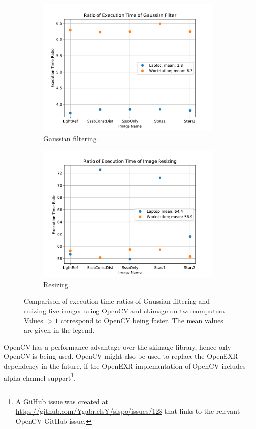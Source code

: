 \begin{figure}[htb]
    \centering
    \begin{subfigure}[b]{0.47\textwidth}
        \centering
        \includegraphics[width=\textwidth]{doc/thesis/0_figures/cv_skimage/Comparison_Gaussian}
        \caption{Gaussian filtering.}
        \label{fig:bm_comparison_gauss}
    \end{subfigure}
    \begin{subfigure}[b]{0.47\textwidth}
        \centering
        \includegraphics[width=\textwidth]{doc/thesis/0_figures/cv_skimage/Comparison_Resize}
        \caption{Resizing.}
        \label{fig:bm_comparison_res}
    \end{subfigure}
    \caption{Comparison of execution time ratios of Gaussian filtering and resizing five images using OpenCV and \gls{skimage} on two computers. Values $> 1$ correspond to OpenCV being faster. The mean values are given in the legend.}
    \label{fig:bm_comparison}
\end{figure}

OpenCV has a performance advantage over the \gls{skimage} library, hence only OpenCV is being used. OpenCV might also be used to replace the OpenEXR dependency in the future, if the OpenEXR implementation of OpenCV includes alpha channel support\footnote{A GitHub issue was created at \url{https://github.com/YgabrielsY/sispo/issues/128} that links to the relevant OpenCV GitHub issue.}.